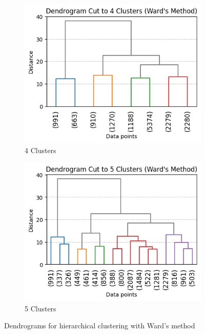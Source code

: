 \begin{figure}[H]
    \centering
    \begin{subfigure}[b]{0.49\textwidth}
        \centering
        \includegraphics[width=\textwidth]{plots/dendrogram_4.png}
        \caption{4 Clusters}
        \label{fig:pairplot_ward}
    \end{subfigure}
    \begin{subfigure}[b]{0.49\textwidth}
        \centering
        \includegraphics[width=\textwidth]{plots/dendrogram_5.png}
        \caption{5 Clusters}
        \label{fig:pairplot_ward_5}
    \end{subfigure}
    \caption{Dendrograms for hierarchical clustering with Ward's method}
    \label{fig:dendrograms_ward}
\end{figure}



